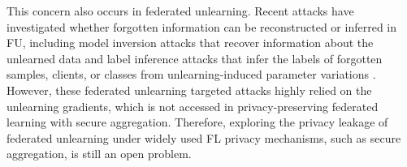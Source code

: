 This concern also occurs in federated unlearning. Recent attacks have investigated whether forgotten information can be reconstructed or inferred in FU, including model inversion attacks that recover information about the unlearned data and label inference attacks that infer the labels of forgotten samples, clients, or classes from unlearning-induced parameter variations \citep{zhou2026model, wang2025label}. However, these federated unlearning targeted attacks highly relied on the unlearning gradients, which is not accessed in privacy-preserving federated learning with secure aggregation. Therefore, exploring the privacy leakage of federated unlearning under widely used FL privacy mechanisms, such as secure aggregation, is still an open problem.





